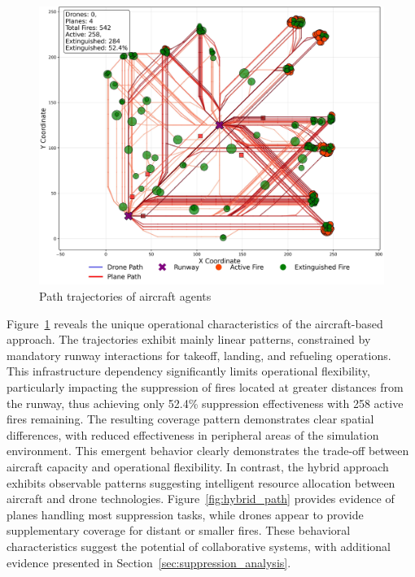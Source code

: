 \documentclass[11pt, a4paper]{article}
\begin{document}
\begin{figure}[H]
    \centering
    \includegraphics[width=1\linewidth]{figures/Firefighting_Plane_agent_paths.jpeg}
    \caption{Path trajectories of aircraft agents}
    \label{fig:plane_path}
\end{figure}

Figure~\ref{fig:plane_path} reveals the unique operational characteristics of the aircraft-based approach. The trajectories exhibit mainly linear patterns, constrained by mandatory runway interactions for takeoff, landing, and refueling operations. This infrastructure dependency significantly limits operational flexibility, particularly impacting the suppression of fires located at greater distances from the runway, thus achieving only 52.4\% suppression effectiveness with 258 active fires remaining. The resulting coverage pattern demonstrates clear spatial differences, with reduced effectiveness in peripheral areas of the simulation environment. This emergent behavior clearly demonstrates the trade-off between aircraft capacity and operational flexibility.
In contrast, the hybrid approach exhibits observable patterns suggesting intelligent resource allocation between aircraft and drone technologies. Figure~\ref{fig:hybrid_path} provides evidence of planes handling most suppression tasks, while drones appear to provide supplementary coverage for distant or smaller fires. These behavioral characteristics suggest the potential of collaborative systems, with additional evidence presented in Section~\ref{sec:suppression_analysis}.
\end{document}

